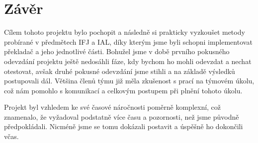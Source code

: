 \documentclass[a4paper, 12pt]{article} %
\begin{document}
    \section{Závěr}
        Cílem tohoto projektu bylo pochopit a následně si prakticky vyzkoušet metody
        probírané v předmětech IFJ a IAL, díky kterým jsme byli schopni implementovat
        překladač a jeho jednotlivé části. Bohužel jsme v době prvního pokusného odevzdání
        projektu ještě nedosáhli fáze, kdy bychom ho mohli odevzdat a nechat otestovat,
        avšak druhé pokusné odevzdání jsme stihli a na základě výsledků postupovali dál.
        Většina členů týmu již měla zkušenost s prací na týmovém úkolu, což nám pomohlo
        s komunikací a celkovým postupem při plnění tohoto úkolu.

        Projekt byl vzhledem ke své časové náročnosti poměrně komplexní, což znamenalo,
        že vyžadoval podstatně více času a pozornosti, než jsme původně předpokládali.
        Nicméně jsme se tomu dokázali postavit a úspěšně ho dokončili včas.

    
\end{document}
